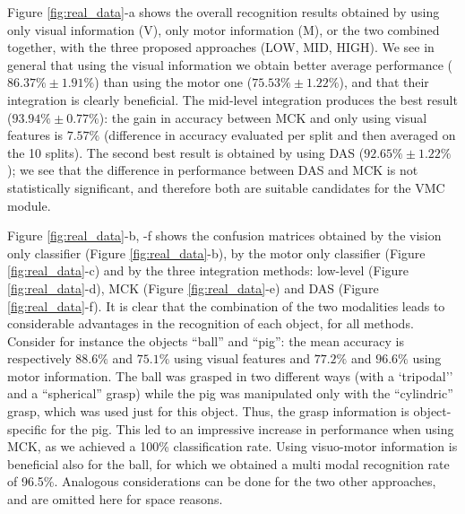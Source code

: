 Figure \ref{fig:real_data}-a shows the overall recognition results obtained by using only visual
information (V), only motor information (M), or the two combined together, with the three proposed approaches (LOW, MID, HIGH). We see in general that using the visual information we obtain better average performance ($86.37\%\pm1.91\%$) than using the motor one
($75.53\%\pm1.22\%$), and that their integration is clearly beneficial. The mid-level integration produces the best result ($93.94\%\pm0.77\%$): the gain in accuracy between MCK and only using visual features is $7.57\%$ (difference in accuracy
evaluated per split and then averaged on the 10 splits).
The second best result is obtained by using DAS ($92.65\%\pm 1.22\%$); we see that the difference in performance between DAS and MCK is 
not statistically significant, and therefore both are suitable candidates for the VMC module. 


Figure \ref{fig:real_data}-b, -f 
shows the confusion matrices obtained by the vision only classifier (Figure  \ref{fig:real_data}-b), by the 
motor only classifier (Figure \ref{fig:real_data}-c) and by the 
three integration methods: low-level (Figure \ref{fig:real_data}-d),
MCK  (Figure \ref{fig:real_data}-e)
and DAS (Figure \ref{fig:real_data}-f). 
It is clear that the combination of the two modalities leads to considerable 
advantages in the recognition of each object, for all methods. 
Consider for instance  the objects ``ball'' and ``pig'':  the mean accuracy is
respectively $88.6\%$ and $75.1\%$ using visual features and $77.2\%$ and $96.6\%$ using motor information. 
The ball was grasped in two different ways (with a `tripodal'' and a ``spherical'' grasp)
while the pig was manipulated only with the ``cylindric'' grasp, which was used just for this object.  
Thus, the grasp information is object-specific for the pig.
This led to an impressive increase in performance when using MCK, as we achieved a 100\% classification rate. Using
visuo-motor information is beneficial also for the ball, for which we obtained a multi modal recognition rate of 96.5\%.
Analogous considerations can be done for the two other approaches, and are omitted here for space reasons.



